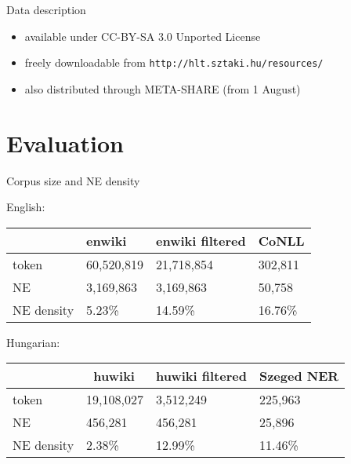 \documentclass[utf8x]{beamer}
\begin{document}
\begin{frame}{Data description}

\begin{itemize}
\item available under CC-BY-SA 3.0 Unported License
\item freely downloadable from {\tt http://hlt.sztaki.hu/resources/} 
\item also distributed through META-SHARE (from 1 August)
\end{itemize}

\end{frame}

\section{Evaluation}

\begin{frame}{Corpus size and NE density}

English: 

\smallskip

\begin{center}
\begin{tabular}{llll}
\hline  & \bf enwiki & \bf enwiki filtered & \bf CoNLL \\ \hline
token & 60,520,819 & 21,718,854 & 302,811 \\
NE & 3,169,863 & 3,169,863 & 50,758 \\
NE density & 5.23\% & 14.59\% & 16.76\% \\ \hline
\end{tabular}
\end{center}

\smallskip

Hungarian:

\smallskip

\begin{center}
\begin{tabular}{llll}
\hline  & \bf huwiki & \bf huwiki filtered  & \bf Szeged NER \\ \hline
token & 19,108,027 & 3,512,249  & 225,963 \\
NE & 456,281 & 456,281  & 25,896 \\
NE density & 2.38\% & 12.99\%  & 11.46\% \\ \hline 
\end{tabular}
\end{center}

\end{frame}
\end{document}
